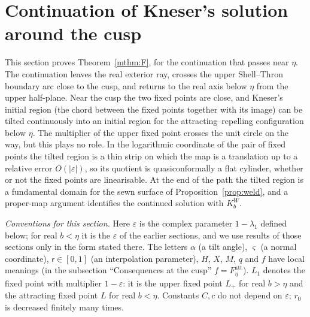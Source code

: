 \documentclass[11pt]{amsart}
\theoremstyle{definition}
\newcommand{\Kk}{K}
\begin{document}


\section{Continuation of Kneser's solution around the cusp}\label{sec:cusp}

This section proves Theorem~\ref{mthm:F}, for the continuation that passes
near $\eta$.  The continuation leaves the real
exterior ray, crosses the upper Shell--Thron boundary arc close to the
cusp, and returns to the real axis below $\eta$ from the upper
half-plane.  Near the cusp the two fixed points are close, and Kneser's
initial region (the chord between the fixed points together with its
image) can be tilted continuously into an initial region for the
attracting--repelling configuration below $\eta$.  The multiplier of the
upper fixed point crosses the unit circle on the way, but this plays no
role.  In the logarithmic coordinate of the pair of fixed points the
tilted region is a thin strip on which the map is a translation up to a
relative error $O(|\varepsilon|)$, so its quotient is quasiconformally a flat
cylinder, whether or not the fixed points are linearisable.  At the end
of the path the tilted region is a fundamental domain for the sewn surface
of Proposition~\ref{prop:weld}, and a proper-map argument identifies the
continued solution with $\Kk^W_b$.

\emph{Conventions for this section.}  Here $\varepsilon$ is the complex parameter
$1-\lambda_1$ defined below; for real $b<\eta$ it is the $\varepsilon$ of the
earlier sections, and
we use results of those sections only in the form stated there.  The letters
$\alpha$ (a tilt angle), $\varsigma$ (a normal coordinate), $\mathsf r\in[0,1]$ (an
interpolation parameter), $H$, $X$, $M$, $q$ and $f$ have local meanings (in the subsection
``Consequences at the cusp'' $f=F_\eta^{\mathrm{att}}$).  $L_1$ denotes
the fixed point with multiplier $1-\varepsilon$: it is the upper fixed point $L_+$ for
real $b>\eta$ and the attracting fixed point $L$ for real $b<\eta$.  Constants
$C,c$ do not depend on $\varepsilon$; $r_0$ is decreased finitely many times.
\end{document}
